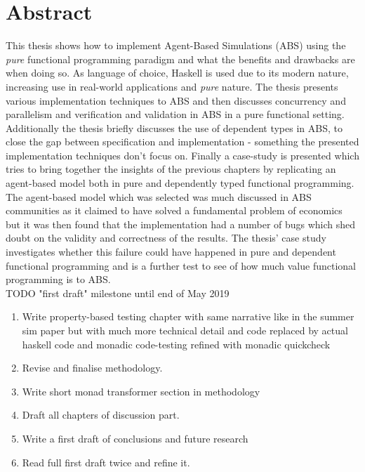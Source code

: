 \documentclass[oneside]{book}
\begin{document}
\section*{Abstract}
This thesis shows how to implement Agent-Based Simulations (ABS) using the \textit{pure} functional programming paradigm and what the benefits and drawbacks are when doing so. As language of choice, Haskell is used due to its modern nature, increasing use in real-world applications and \textit{pure} nature. The thesis presents various implementation techniques to ABS and then discusses concurrency and parallelism and verification and validation in ABS in a pure functional setting. Additionally the thesis briefly discusses the use of dependent types in ABS, to close the gap between specification and implementation - something the presented implementation techniques don't focus on.
Finally a case-study is presented which tries to bring together the insights of the previous chapters by replicating an agent-based model both in pure and dependently typed functional programming. The agent-based model which was selected was much discussed in ABS communities as it claimed to have solved a fundamental problem of economics but it was then found that the implementation had a number of bugs which shed doubt on the validity and correctness of the results. The thesis' case study investigates whether this failure could have happened in pure and dependent functional programming and is a further test to see of how much value functional programming is to ABS. \\


TODO "first draft" milestone until end of May 2019
\begin{enumerate}
	\item Write property-based testing chapter with same narrative like in the summer sim paper but with much more technical detail and code replaced by actual haskell code and monadic code-testing refined with monadic quickcheck	
	
	\item Revise and finalise methodology.

	\item Write short monad transformer section in methodology

	\item Draft all chapters of discussion part.
	
	\item Write a first draft of conclusions and future research
	
	\item Read full first draft twice and refine it.
\end{enumerate}
\end{document}
